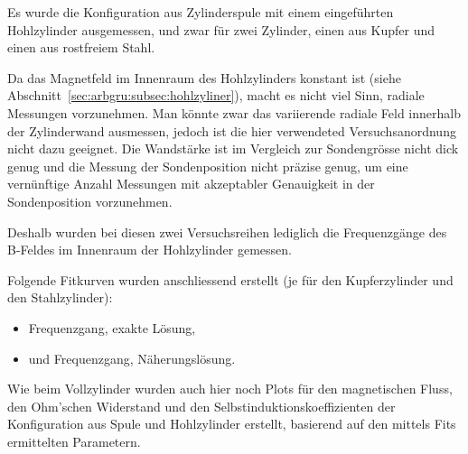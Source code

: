 Es  wurde  die  Konfiguration   aus  Zylinderspule  mit  einem  eingef\"uhrten
Hohlzylinder ausgemessen, und  zwar f\"ur zwei Zylinder, einen  aus Kupfer und
einen aus rostfreiem Stahl.

Da  das  Magnetfeld  im  Innenraum   des  Hohlzylinders  konstant  ist  (siehe
Abschnitt~\ref{sec:arbgru:subsec:hohlzyliner}),  macht  es  nicht  viel  Sinn,
radiale  Messungen  vorzunehmen. Man  k\"onnte zwar  das  variierende  radiale
Feld innerhalb  der Zylinderwand  ausmessen, jedoch  ist die  hier verwendeted
Versuchsanordnung nicht  dazu geeignet. Die Wandst\"arke ist  im Vergleich zur
Sondengr\"osse  nicht dick  genug  und die  Messung  der Sondenposition  nicht
pr\"azise  genug,  um  eine  vern\"unftige Anzahl  Messungen  mit  akzeptabler
Genauigkeit in der Sondenposition vorzunehmen.

Deshalb wurden  bei diesen  zwei Versuchsreihen lediglich  die Frequenzg\"ange
des B-Feldes im Innenraum der Hohlzylinder gemessen.

Folgende Fitkurven wurden anschliessend  erstellt (je f\"ur den Kupferzylinder
und den Stahlzylinder):
\begin{itemize}
    \item
        Frequenzgang, exakte L\"osung,
    \item
        und Frequenzgang, N\"aherungsl\"osung.
\end{itemize}

Wie  beim Vollzylinder  wurden auch  hier  noch Plots  f\"ur den  magnetischen
Fluss,  den Ohm'schen  Widerstand  und  den Selbstinduktionskoeffizienten  der
Konfiguration aus Spule  und Hohlzylinder erstellt, basierend  auf den mittels
Fits ermittelten Parametern.


